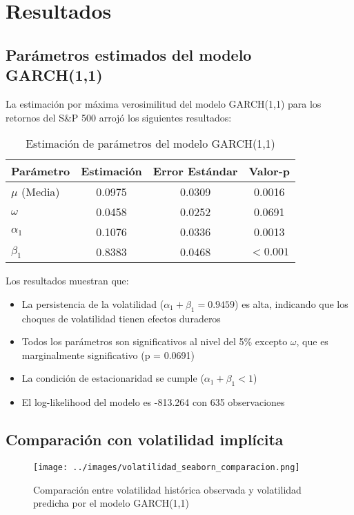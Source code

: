 \section{Resultados}

\subsection{Parámetros estimados del modelo GARCH(1,1)}

La estimación por máxima verosimilitud del modelo GARCH(1,1) para los retornos del S\&P 500 arrojó los siguientes resultados:

\begin{table}[hbt!]
\centering
\caption{Estimación de parámetros del modelo GARCH(1,1)}
\begin{tabular}{lccc}
\hline
\textbf{Parámetro} & \textbf{Estimación} & \textbf{Error Estándar} & \textbf{Valor-p} \\
\hline
$\mu$ (Media) & 0.0975 & 0.0309 & 0.0016 \\
$\omega$ & 0.0458 & 0.0252 & 0.0691 \\
$\alpha_1$ & 0.1076 & 0.0336 & 0.0013 \\
$\beta_1$ & 0.8383 & 0.0468 & $< 0.001$ \\
\hline
\end{tabular}
\label{tab:garch_params}
\end{table}

Los resultados muestran que:
\begin{itemize}
    \item La persistencia de la volatilidad ($\alpha_1 + \beta_1 = 0.9459$) es alta, indicando que los choques de volatilidad tienen efectos duraderos
    \item Todos los parámetros son significativos al nivel del 5\% excepto $\omega$, que es marginalmente significativo (p = 0.0691)
    \item La condición de estacionaridad se cumple ($\alpha_1 + \beta_1 < 1$)
    \item El log-likelihood del modelo es -813.264 con 635 observaciones
\end{itemize}

\subsection{Comparación con volatilidad implícita}

\begin{figure}[hbt!]
    \centering
    \texttt{[image: ../images/volatilidad\_seaborn\_comparacion.png]}
    \caption{Comparación entre volatilidad histórica observada y volatilidad predicha por el modelo GARCH(1,1)}
    \label{fig:volatilidad_comparacion}   
\end{figure}

